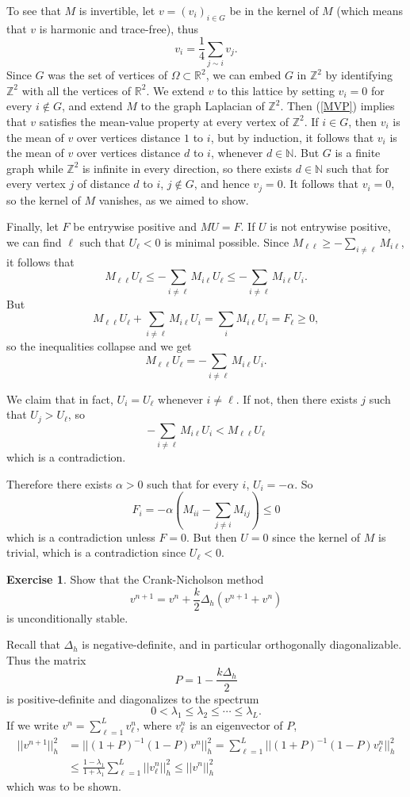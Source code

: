 \documentclass[10pt]{article}
\newcommand{\NN}{\mathbb{N}}
\newcommand{\ZZ}{\mathbb{Z}}
\newcommand{\RR}{\mathbb{R}}
\theoremstyle{definition}
\newtheorem{exer}{Exercise}
\begin{document}
To see that $M$ is invertible, let $v = (v_i)_{i \in G}$ be in the kernel of $M$ (which means that $v$ is harmonic and trace-free), thus
\begin{equation}
\label{MVP}
v_i = \frac{1}{4} \sum_{j \sim i} v_j.
\end{equation}
Since $G$ was the set of vertices of $\Omega \subset \RR^2$, we can embed $G$ in $\ZZ^2$ by identifying $\ZZ^2$ with all the vertices of $\RR^2$.
We extend $v$ to this lattice by setting $v_i = 0$ for every $i \notin G$, and extend $M$ to the graph Laplacian of $\ZZ^2$.
Then (\ref{MVP}) implies that $v$ satisfies the mean-value property at every vertex of $\ZZ^2$.
If $i \in G$, then $v_i$ is the mean of $v$ over vertices distance $1$ to $i$, but by induction, it follows that $v_i$ is the mean of $v$ over vertices distance $d$ to $i$, whenever $d \in \NN$.
But $G$ is a finite graph while $\ZZ^2$ is infinite in every direction, so there exists $d \in \NN$ such that for every vertex $j$ of distance $d$ to $i$, $j \notin G$, and hence $v_j = 0$.
It follows that $v_i = 0$, so the kernel of $M$ vanishes, as we aimed to show.

Finally, let $F$ be entrywise positive and $MU = F$.
If $U$ is not entrywise positive, we can find $\ell$ such that $U_\ell < 0$ is minimal possible.
Since $M_{\ell\ell} \geq -\sum_{i \neq \ell} M_{i\ell}$, it follows that
$$M_{\ell\ell} U_\ell \leq -\sum_{i \neq \ell} M_{i\ell} U_\ell \leq -\sum_{i \neq \ell} M_{i\ell} U_i.$$
But
$$M_{\ell\ell} U_\ell + \sum_{i \neq \ell} M_{i\ell} U_i = \sum_i M_{i\ell} U_i = F_\ell \geq 0,$$
so the inequalities collapse and we get
$$ M_{\ell\ell} U_\ell = -\sum_{i \neq \ell} M_{i\ell} U_i.$$

We claim that in fact, $U_i = U_\ell$ whenever $i \neq \ell$.
If not, then there exists $j$ such that $U_j > U_\ell$, so
$$-\sum_{i \neq \ell} M_{i\ell} U_i < M_{\ell \ell} U_\ell$$
which is a contradiction.

Therefore there exists $\alpha > 0$ such that for every $i$, $U_i = -\alpha$.
So
$$F_i = -\alpha\left(M_{ii} - \sum_{j \neq i} M_{ij}\right) \leq 0$$
which is a contradiction unless $F = 0$. But then $U = 0$ since the kernel of $M$ is trivial, which is a contradiction since $U_\ell < 0$.

\begin{exer}
Show that the Crank-Nicholson method
$$v^{n+1} = v^n + \frac{k}{2} \Delta_h (v^{n + 1} + v^n)$$
is unconditionally stable.
\end{exer}

Recall that $\Delta_h$ is negative-definite, and in particular orthogonally diagonalizable.
Thus the matrix
$$P = 1 - \frac{k\Delta_h}{2}$$
is positive-definite and diagonalizes to the spectrum
$$0 < \lambda_1 \leq \lambda_2 \leq \cdots \leq \lambda_L.$$
If we write $v^n = \sum_{\ell=1}^L v^n_\ell$, where $v^n_\ell$ is an eigenvector of $P$,
\begin{align*}
||v^{n+1}||_h^2 &= ||(1 + P)^{-1} (1 - P) v^n||_h^2 = \sum_{\ell=1}^L ||(1 + P)^{-1} (1 - P) v^n_\ell||_h^2\\
&\leq \frac{1 - \lambda_1}{1 + \lambda_1} \sum_{\ell=1}^L ||v^n_\ell||_h^2 \leq ||v^n||_h^2
\end{align*}
which was to be shown.
\end{document}
